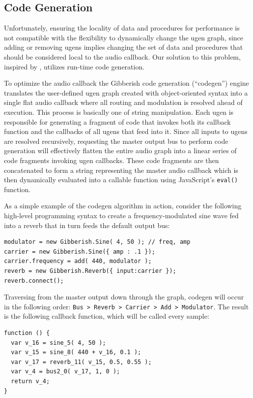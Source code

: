 \subsection{Code Generation}

Unfortunately, ensuring the locality of data and procedures for performance is not compatible with the flexibility to dynamically change the ugen graph, since adding or removing ugens implies changing the set of data and procedures that should be considered local to the audio callback. Our solution to this problem, inspired by  \cite{Wakefield:2012}, utilizes run-time code generation.

To optimize the audio callback the Gibberish code generation (``codegen'') engine translates the user-defined ugen graph created with object-oriented syntax into a single flat audio callback where all routing and modulation is resolved ahead of execution. This process is basically one of string manipulation. Each ugen is responsible for generating a fragment of code that invokes both its callback function and the callbacks of all ugens that feed into it. Since all inputs to ugens are resolved recursively, requesting the master output bus to perform code generation will effectively flatten the entire audio graph into a linear series of code fragments invoking ugen callbacks. These code fragments are then concatenated to form a string representing the master audio callback which is then dynamically evaluated into a callable function using JavaScript's \texttt{eval()} function.

As a simple example of the codegen algorithm in action, consider the following high-level programming syntax to create a frequency-modulated sine wave fed into a reverb that in turn feeds the default output bus:

{\small {\begin{verbatim}
modulator = new Gibberish.Sine( 4, 50 ); // freq, amp
carrier = new Gibberish.Sine({ amp : .1 });
carrier.frequency = add( 440, modulator );
reverb = new Gibberish.Reverb({ input:carrier });
reverb.connect();
\end{verbatim}}}

Traversing from the master output down through the graph, codegen will occur in the following order: \texttt{Bus > Reverb > Carrier > Add > Modulator}. The result is the following callback function, which will be called every sample:

{\small {\begin{verbatim}
function () {
  var v_16 = sine_5( 4, 50 ); 
  var v_15 = sine_8( 440 + v_16, 0.1 );
  var v_17 = reverb_11( v_15, 0.5, 0.55 );
  var v_4 = bus2_0( v_17, 1, 0 );
  return v_4;
}
\end{verbatim}}}

